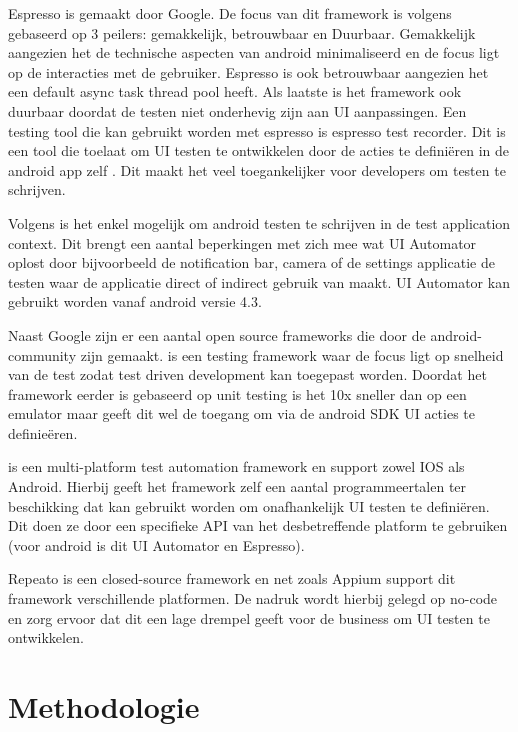 Espresso is gemaakt door Google. De focus van dit framework is volgens \textcite{Zakharov2013} gebaseerd op 3 peilers:
gemakkelijk, betrouwbaar en Duurbaar. Gemakkelijk aangezien het de technische aspecten van android minimaliseerd en de focus ligt op de interacties met de gebruiker. Espresso is ook betrouwbaar aangezien het een default async task thread pool heeft. Als laatste is het framework ook duurbaar doordat de testen niet onderhevig zijn aan UI aanpassingen.
Een testing tool die kan gebruikt worden met espresso is espresso test recorder. Dit is een tool die toelaat om UI testen te ontwikkelen door de acties te definiëren in de android app zelf \textcite{Google2022a}. Dit maakt het veel toegankelijker voor developers om testen te schrijven.

Volgens \autocite{Zelenchuk} is het enkel mogelijk om android testen te schrijven in de test application context. Dit brengt een aantal beperkingen met zich mee wat UI Automator oplost door bijvoorbeeld de notification bar, camera of de settings applicatie de testen waar de applicatie direct of indirect gebruik van maakt. UI Automator kan gebruikt worden vanaf android versie 4.3.

Naast Google zijn er een aantal open source frameworks die door de android-community zijn gemaakt. \textcite{Roboelectric2022} is een testing framework waar de focus ligt op snelheid van de test zodat test driven development kan toegepast worden. Doordat het framework eerder is gebaseerd op unit testing is het 10x sneller dan op een emulator maar geeft dit wel de toegang om via de android SDK UI acties te definieëren.

\textcite{key1} is een multi-platform test automation framework en support zowel IOS als Android. Hierbij geeft het framework zelf een aantal programmeertalen ter beschikking dat kan gebruikt worden om onafhankelijk UI testen te definiëren. Dit doen ze door een specifieke API van het desbetreffende platform te gebruiken (voor android is dit UI Automator en Espresso).

Repeato is een closed-source framework en net zoals Appium support dit framework verschillende platformen. De nadruk wordt hierbij gelegd op no-code en zorg ervoor dat dit een lage drempel geeft voor de business om UI testen te ontwikkelen.

\section{Methodologie}%
\label{sec:methodologie}

